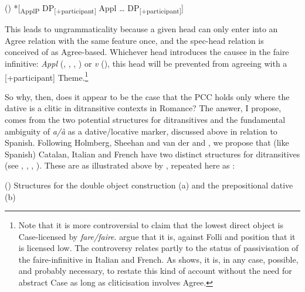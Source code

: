 \documentclass[output=paper,modfonts,nonflat]{langsci/langscibook}
\begin{document}
()  *[\textsubscript{ApplP} DP\textsubscript{[+participant]} Appl … DP\textsubscript{[+participant]}]

\begin{styleNormalWeb}
This leads to ungrammaticality because a given head can only enter into an Agree relation with the same feature once, and the spec-head relation is conceived of as Agree-based. Whichever head introduces the causee in the faire infinitive: \textit{Appl} (\citealt{Ippolito2000}, \citealt{Ordóñez2008}, \citealt{Torrego2010}, \citealt{PitteroffCampanini2014}) or \textit{v} (\citealt{FolliHarley2007}), this head will be prevented from agreeing with a [+participant] Theme.\footnote{Note that it is more controversial to claim that the lowest direct object is Case-licensed by \textit{fare/faire}. \citet{BellettiRizzi2012} argue that it is, against Folli and  position that it is licensed low. The controversy relates partly to the status of passivisation of the faire-infinitive in Italian and French. As \citet{Preminger2019} shows, it is, in any case, possible, and probably necessary, to restate this kind of account without the need for abstract Case as long as cliticisation involves Agree.}   
\end{styleNormalWeb}

\begin{styleNormalWeb}
So why, then, does it appear to be the case that the PCC holds only where the dative is a clitic in ditransitive contexts in Romance? The answer, I propose, comes from the two potential structures for ditransitives and the fundamental ambiguity of \textit{a/à} as a dative/locative marker, discussed above in relation to Spanish. Following Holmberg, Sheehan and van der \citet{Wal2017} and \citet{Fournier2010}, we propose that (like Spanish) Catalan, Italian and French have two distinct structures for ditransitives (see \citealt{Demonte1995}, \citealt{Cuervo2003}, \citealt{Harley2002}, \citealt{HarleyMiyagawa2017}). These are as illustrated above by , repeated here as :
\end{styleNormalWeb}

()  Structures for the double object construction (a) and the prepositional dative (b)

 

 
\end{document}
